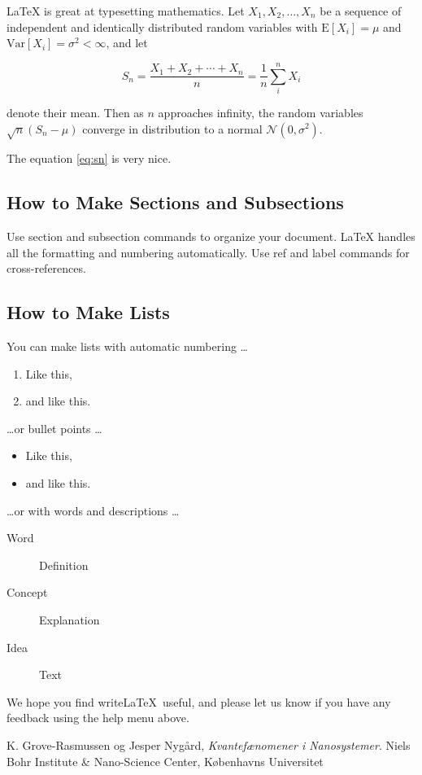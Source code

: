 \documentclass[a4paper]{article}
\begin{document}
\LaTeX{} is great at typesetting mathematics. Let $X_1, X_2, \ldots, X_n$ be a sequence of independent and identically distributed random variables with $\text{E}[X_i] = \mu$ and $\text{Var}[X_i] = \sigma^2 < \infty$, and let

\begin{equation}
S_n = \frac{X_1 + X_2 + \cdots + X_n}{n}
      = \frac{1}{n}\sum_{i}^{n} X_i
\label{eq:sn}
\end{equation}

denote their mean. Then as $n$ approaches infinity, the random variables $\sqrt{n}(S_n - \mu)$ converge in distribution to a normal $\mathcal{N}(0, \sigma^2)$.

The equation \ref{eq:sn} is very nice.

\subsection{How to Make Sections and Subsections}

Use section and subsection commands to organize your document. \LaTeX{} handles all the formatting and numbering automatically. Use ref and label commands for cross-references.

\subsection{How to Make Lists}

You can make lists with automatic numbering \dots

\begin{enumerate}
\item Like this,
\item and like this.
\end{enumerate}
\dots or bullet points \dots
\begin{itemize}
\item Like this,
\item and like this.
\end{itemize}
\dots or with words and descriptions \dots
\begin{description}
\item[Word] Definition
\item[Concept] Explanation
\item[Idea] Text
\end{description}

We hope you find write\LaTeX\ useful, and please let us know if you have any feedback using the help menu above.


\begin{thebibliography}{9}
  K. Grove-Rasmussen og Jesper Nygård,
  \emph{Kvantefænomener i Nanosystemer}.
  Niels Bohr Institute \& Nano-Science Center, Københavns Universitet

\end{thebibliography}
\end{document}
